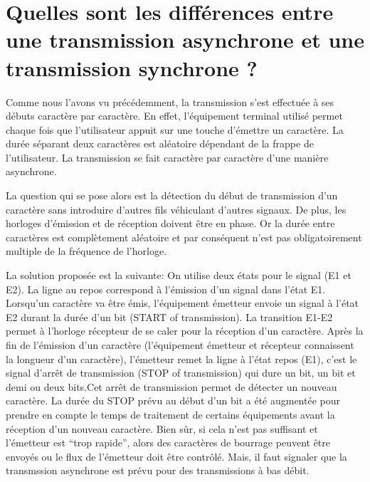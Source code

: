 \section{Quelles sont les différences entre une transmission asynchrone et une transmission synchrone ?}
Comme nous l'avons vu précédemment, la transmission s'est effectuée à ses débuts caractère par
caractère. En effet, l'équipement terminal utilisé permet chaque fois que l'utilisateur appuit
sur une touche d'émettre un caractère. La durée séparant deux caractères est aléatoire
dépendant de la frappe de l'utilisateur. La transmission se fait caractère par caractère d'une
manière asynchrone.

La question qui se pose alors est la détection du début de transmission d'un caractère sans
introduire d'autres fils véhiculant d'autres signaux. De plus, les horloges d'émission et de
réception doivent être en phase. Or la durée entre caractères est complètement aléatoire et
par conséquent n'est pas obligatoirement multiple de la fréquence de l'horloge.

La solution proposée est la suivante:
On utilise deux états pour le signal (E1 et E2). La ligne au repos correspond à l'émission
d'un signal dans l'état E1. Lorsqu'un caractère va être émis, l'équipement émetteur envoie un
signal à l'état E2 durant la durée d'un bit (START of transmission). La transition E1-E2
permet à l'horloge récepteur de se caler pour la réception d'un caractère. Après la fin de
l'émission d'un caractère (l'équipement émetteur et récepteur connaissent la longueur d'un
caractère), l'émetteur remet la ligne à l'état repos (E1), c'est le signal d'arrêt de
transmission (STOP of transmission) qui dure un bit, un bit et demi ou deux bits.Cet arrêt de
transmission permet de détecter un nouveau caractère. La durée du STOP prévu au début d'un bit
a été augmentée pour prendre en compte le temps de traitement de certains équipements avant la
réception d'un nouveau caractère. Bien sûr, si cela n'est pas suffisant et l'émetteur est
``trop rapide'', alors des caractères de bourrage peuvent être envoyés ou le flux de
l'émetteur doit être contrôlé. Mais, il faut signaler que la transmssion asynchrone est prévu
pour des transmissions à bas débit.


